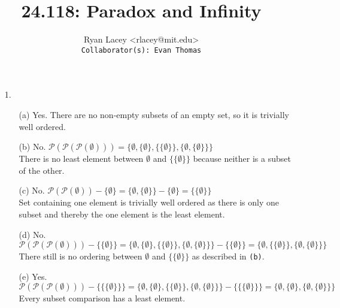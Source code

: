 \documentclass{article}
\begin{document}

\title{24.118: Paradox and Infinity}
\author{
  Ryan Lacey <rlacey@mit.edu>\\
  \footnotesize \texttt{Collaborator(s): Evan Thomas}
}
        
\maketitle
        


\begin{enumerate}
\item[1.]
	\begin{enumerate}
		\item[(a)]
			Yes. There are no non-empty subsets of an empty set, so it is trivially  well ordered.
		\item[(b)]
			No. $\mathcal{P}(\mathcal{P}(\mathcal{P}(\emptyset))) = \{\emptyset, \{\emptyset\}, \{\{\emptyset\}\}, \{\emptyset, \{\emptyset\}\} \}$\\
			There is no least element between $\emptyset$ and $\{\{\emptyset\}\}$ because neither is a subset of the other. 
		\item[(c)]
			No. $\mathcal{P}(\mathcal{P}(\emptyset)) - \{\emptyset\} = \{\emptyset, \{\emptyset\} \} - \{\emptyset\} = \{\{\emptyset\} \}$\\
			Set containing one element is trivially well ordered as there is only one subset and thereby the one element is the least element.
		\item[(d)]
			No. $\mathcal{P}(\mathcal{P}(\mathcal{P}(\emptyset))) - \{\{\emptyset\}\} = \{\emptyset, \{\emptyset\}, \{\{\emptyset\}\}, \{\emptyset, \{\emptyset\}\} \} - \{\{\emptyset\}\} =  \{\emptyset, \{\{\emptyset\}\}, \{\emptyset, \{\emptyset\}\} \} $\\
			There still is no ordering between $\emptyset$ and $\{\{\emptyset\}\}$ as described in \texttt{(b)}.
		\item[(e)]
			Yes. $\mathcal{P}(\mathcal{P}(\mathcal{P}(\emptyset))) - \{\{\{\emptyset\}\}\} = \{\emptyset, \{\emptyset\}, \{\{\emptyset\}\}, \{\emptyset, \{\emptyset\}\} \} - \{\{\{\emptyset\}\}\} =  \{\emptyset, \{\emptyset\}, \{\emptyset, \{\emptyset\}\} \} $\\
			Every subset comparison has a least element.
	\end{enumerate}


\end{enumerate}
\end{document}
